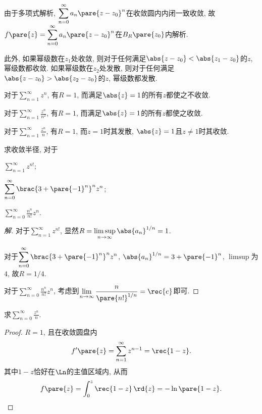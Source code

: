\documentclass{ctexart}
\begin{document}
由于多项式解析, $\displaystyle \sum_{n=0}^\infty a_n\pare{z-z_0}^n$在收敛圆内内闭一致收敛, 故$f\pare{z} = \displaystyle \sum_{n=0}^\infty a_n\pare{z-z_0}^n$在$B_R\pare{z_0}$内解析.
\par
此外, 如果幂级数在$z_1$处收敛, 则对于任何满足$\abs{z-z_0}<\abs{z_1-z_0}$的$z$, 幂级数都收敛. 如果幂级数在$z_2$处发散, 则对于任何满足$\abs{z-z_0}>\abs{z_2-z_0}$的$z$, 幂级数都发散.
\begin{sample}
    \begin{ex}
        对于$\displaystyle \sum_{n=1}^\infty z^n$, 有$R=1$, 而满足$\abs{z}=1$的所有$z$都使之不收敛.
    \end{ex}
    \begin{ex}
        对于$\displaystyle \sum_{n=1}^\infty \frac{z^n}{n^2}$, 有$R=1$, 而满足$\abs{z}=1$的所有$z$都使之收敛.
    \end{ex}
    \begin{ex}
        对于$\displaystyle \sum_{n=1}^\infty \frac{z^n}{n}$, 有$R=1$, 而$z=1$时其发散, $\abs{z}=1$且$z\neq 1$时其收敛.
    \end{ex}
\end{sample}
\begin{sample}
    \begin{ex}
        求收敛半径, 对于
        \begin{cenum}
            \item $\displaystyle \sum_{n=1}^\infty z^{n!}$;
            \item $\displaystyle \sum_{n=0}^\infty \brac{3+\pare{-1}^n}^nz^n$;
            \item $\displaystyle \sum_{n=0}^\infty \frac{n^n}{n!}z^n$.
        \end{cenum}
    \end{ex}
    \begin{proof}[解]
        对于$\displaystyle \sum_{n=1}^\infty z^{n!}$, 显然$R = \limsup\limits_{n\rightarrow \infty} \abs{a_n}^{1/n} = 1$.
        \par
        对于$\displaystyle \sum_{n=0}^\infty \brac{3+\pare{-1}^n}^nz^n$, $\abs{a_n}^{1/n} = 3+\pare{-1}^n$, $\limsup$为$4$, 故$R = 1/4$.
        \par
        对于$\displaystyle \sum_{n=0}^\infty \frac{n^n}{n!}z^n$, 考虑到$\displaystyle \lim_{n\rightarrow \infty} \frac{n}{\pare{n!}^{1/n}} = \rec{e}$即可.
    \end{proof}
\end{sample}
\begin{sample}
    \begin{ex}
        求$\displaystyle \sum_{n=0}^\infty \frac{z^n}{n}$.
    \end{ex}
    \begin{proof}
        $R=1$, 且在收敛圆盘内
        \[ f'\pare{z} = \sum_{n=1}^\infty z^{n-1} = \rec{1-z}. \]
        其中$1-z$恰好在$\Ln$的主值区域内, 从而
        \[ f\pare{z} = \int_{0}^z \rec{1-z}\,\rd{z} = -\ln\pare{1-z}. \qedhere \]
    \end{proof}
\end{sample}
\end{document}
